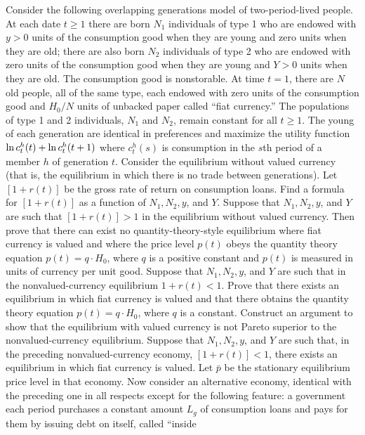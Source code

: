 \noindent Consider the following overlapping generations model of two-period-lived
people.  At each date $t\ge 1$ there are born $N_1$ individuals of type 1 who
are endowed with $y>0$ units of the consumption good when they are young and
zero units when they are old; there are also born $N_2$ individuals of type 2
who are endowed with zero units of the consumption good when they are young and
$Y>0$ units when they are old.  The consumption good is nonstorable.  At time
$t=1$, there are $N$ old people, all of the same type, each endowed with zero
units of the consumption good and $H_0/N$ units of unbacked paper called ``fiat
currency.'' The populations of type 1 and 2 individuals, $N_1$ and $N_2$,
remain constant for all $t\ge 1$.  The young of each generation are identical
in preferences and maximize the utility function $\ln c_t^h(t) +\ln
c_t^h({t+1})$ where $c_t^h(s)$ is consumption in the $s$th period of a member
$h$ of generation $t$.
\medskip
{} Consider the equilibrium without valued currency (that is, the
equilibrium in which there is no trade between generations).  Let $[1+r(t)]$ be
the gross rate of return on consumption loans.  Find a formula for $[1+r(t)]$
as a function of $N_1, N_2,y$, and $Y$.\medskip
{} Suppose that $N_1,N_2,y$,
 and $Y$ are such that $[1+r(t)]>1$ in the
equilibrium without valued currency.  Then prove that there can
exist no quantity-theory-style equilibrium where fiat currency is
valued and where the price level $p(t)$ obeys the quantity theory
equation $p(t)=q\cdot H_0$, where $q$ is a positive constant and
$p(t)$ is measured in units of currency per unit good.
\medskip
{} Suppose that $N_1,N_2,y$, and $Y$ are such that in the
nonvalued-currency equilibrium $1+r(t)<1$.  Prove that there
exists an equilibrium in which fiat currency is valued and that
there obtains the quantity theory equation $p(t)=q\cdot H_0$,
where $q$ is a constant.  Construct an argument to show that the
equilibrium with valued currency is not Pareto superior to the
nonvalued-currency equilibrium.
\medskip {} Suppose that
$N_1,N_2,y$, and $Y$ are such that, in the preceding
nonvalued-currency economy, $[1+r(t)]<1$, there exists an
equilibrium in  which fiat currency is valued.  Let $\bar p$ be
the stationary equilibrium price level in that economy.  Now
consider an alternative economy, identical with the preceding one
in all respects except for the following feature: a government
each period purchases a constant amount $L_g$ of consumption loans
and pays for them by issuing debt on itself, called ``inside
